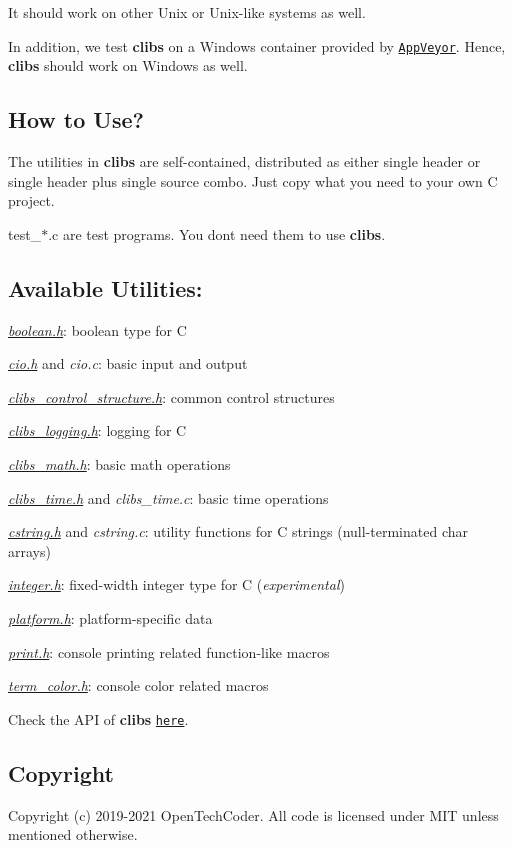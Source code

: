 It should work on other Unix or Unix-\/like systems as well.

In addition, we test {\bfseries clibs} on a Windows container provided by \href{https://www.appveyor.com/}{\tt App\+Veyor}. Hence, {\bfseries clibs} should work on Windows as well.

\subsection*{How to Use?}

The utilities in {\bfseries clibs} are self-\/contained, distributed as either single header or single header plus single source combo. Just copy what you need to your own C project.

test\+\_\+$\ast$.c are test programs. You don\textquotesingle{}t need them to use {\bfseries clibs}.

\subsection*{Available Utilities\+:}


\begin{DoxyItemize}
\item {\itshape \hyperlink{boolean_8h}{boolean.\+h}}\+: boolean type for C
\item {\itshape \hyperlink{cio_8h}{cio.\+h}} and {\itshape cio.\+c}\+: basic input and output
\item {\itshape \hyperlink{clibs__control__structure_8h}{clibs\+\_\+control\+\_\+structure.\+h}}\+: common control structures
\item {\itshape \hyperlink{clibs__logging_8h}{clibs\+\_\+logging.\+h}}\+: logging for C
\item {\itshape \hyperlink{clibs__math_8h}{clibs\+\_\+math.\+h}}\+: basic math operations
\item {\itshape \hyperlink{clibs__time_8h}{clibs\+\_\+time.\+h}} and {\itshape clibs\+\_\+time.\+c}\+: basic time operations
\item {\itshape \hyperlink{cstring_8h}{cstring.\+h}} and {\itshape cstring.\+c}\+: utility functions for C strings (null-\/terminated {\ttfamily char} arrays)
\item {\itshape \hyperlink{integer_8h}{integer.\+h}}\+: fixed-\/width integer type for C ({\itshape experimental})
\item {\itshape \hyperlink{platform_8h}{platform.\+h}}\+: platform-\/specific data
\item {\itshape \hyperlink{print_8h}{print.\+h}}\+: console printing related function-\/like macros
\item {\itshape \hyperlink{term__color_8h}{term\+\_\+color.\+h}}\+: console color related macros
\end{DoxyItemize}

Check the A\+PI of {\bfseries clibs} \href{https://cwchentw.github.io/clibs/html/index.html}{\tt here}.

\subsection*{Copyright}

Copyright (c) 2019-\/2021 OpenTechCoder. All code is licensed under M\+IT unless mentioned otherwise. 